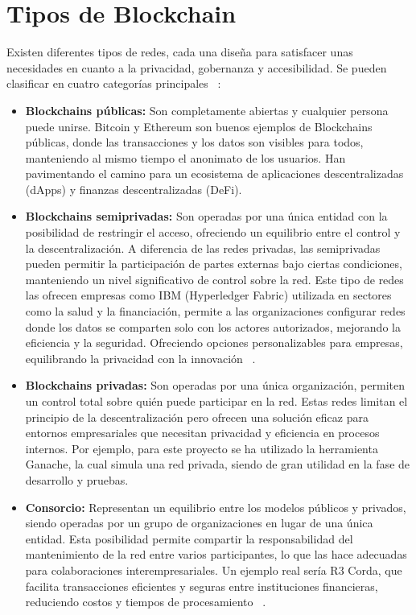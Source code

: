 \section{Tipos de Blockchain}

Existen diferentes tipos de redes, cada una diseña para satisfacer unas necesidades en cuanto a la privacidad, gobernanza y accesibilidad. 
Se pueden clasificar en cuatro categorías principales ~\cite{introducciónBlockchain}:

\begin{itemize}
\item \textbf{Blockchains públicas:} Son completamente abiertas y cualquier persona puede unirse. Bitcoin y Ethereum son buenos ejemplos de Blockchains públicas, donde las transacciones y los datos son visibles para todos, manteniendo al mismo tiempo el anonimato de los usuarios. Han pavimentando el camino para un ecosistema de aplicaciones descentralizadas (dApps) y finanzas descentralizadas (DeFi).

\item \textbf{Blockchains semiprivadas:} Son operadas por una única entidad con la posibilidad de restringir el acceso, ofreciendo un equilibrio entre el control y la descentralización. A diferencia de las redes privadas, las semiprivadas pueden permitir la participación de partes externas bajo ciertas condiciones, manteniendo un nivel significativo de control sobre la red.
Este tipo de redes las ofrecen empresas como IBM (Hyperledger Fabric) utilizada en sectores como la salud y la financiación, permite a las organizaciones configurar redes donde los datos se comparten solo con los actores autorizados, mejorando la eficiencia y la seguridad. Ofreciendo opciones personalizables para empresas, equilibrando la privacidad con la innovación ~\cite{Hyperledger}.

\item \textbf{Blockchains privadas:} Son operadas por una única organización, permiten un control total sobre quién puede participar en la red. Estas redes limitan el principio de la descentralización pero ofrecen una solución eficaz para entornos empresariales que necesitan privacidad y eficiencia en procesos internos.
Por ejemplo, para este proyecto se ha utilizado la herramienta Ganache, la cual simula una red privada, siendo de gran utilidad en la fase de desarrollo y pruebas.

\item \textbf{Consorcio:} Representan un equilibrio entre los modelos públicos y privados, siendo operadas por un grupo de organizaciones en lugar de una única entidad. Esta posibilidad permite compartir la responsabilidad del mantenimiento de la red entre varios participantes, lo que las hace adecuadas para colaboraciones interempresariales. 
Un ejemplo real sería R3 Corda, que facilita transacciones eficientes y seguras entre instituciones financieras, reduciendo costos y tiempos de procesamiento ~\cite{R3Corda}.

\end{itemize} 


